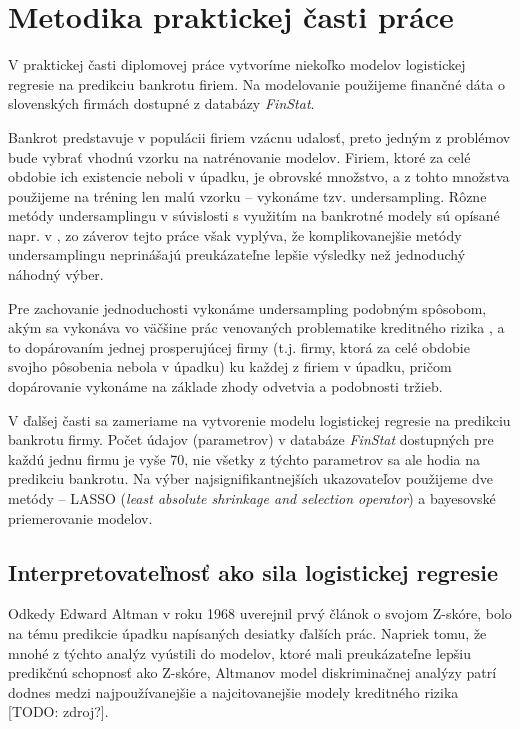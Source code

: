 \section{Metodika praktickej časti práce}
\label{metodika}

V praktickej časti diplomovej práce vytvoríme niekoľko modelov logistickej regresie na predikciu bankrotu firiem.
Na modelovanie použijeme finančné dáta o slovenských firmách dostupné z databázy \emph{FinStat}.

Bankrot predstavuje v populácii firiem vzácnu udalosť, preto jedným z problémov bude vybrať vhodnú vzorku na natrénovanie modelov.
Firiem, ktoré za celé obdobie ich existencie neboli v úpadku, je obrovské množstvo, a z tohto množstva použijeme na tréning len malú vzorku – vykonáme tzv. undersampling.
Rôzne metódy undersamplingu v súvislosti s využitím na bankrotné modely sú opísané napr. v \cite{protopapadakis},
zo záverov tejto práce však vyplýva, že komplikovanejšie metódy undersamplingu neprinášajú preukázateľne lepšie výsledky než jednoduchý náhodný výber.

Pre zachovanie jednoduchosti vykonáme undersampling podobným spôsobom, akým sa vykonáva vo väčšine prác venovaných problematike kreditného rizika \cite{zmijewski},
a to dopárovaním jednej prosperujúcej firmy (t.j. firmy, ktorá za celé obdobie svojho pôsobenia nebola v úpadku) ku každej z firiem v úpadku,
pričom dopárovanie vykonáme na základe zhody odvetvia a podobnosti tržieb.

V ďalšej časti sa zameriame na vytvorenie modelu logistickej regresie na predikciu bankrotu firmy.
Počet údajov (parametrov) v databáze \emph{FinStat} dostupných pre každú jednu firmu je vyše 70, nie všetky z týchto parametrov sa ale hodia na predikciu bankrotu.
Na výber najsignifikantnejších ukazovateľov použijeme dve metódy – LASSO (\emph{least absolute shrinkage and selection operator}) a bayesovské priemerovanie modelov.

\subsection{Interpretovateľnosť ako sila logistickej regresie} \label{model interpretability}

Odkedy Edward Altman v roku 1968 uverejnil prvý článok o svojom Z-skóre, bolo na tému predikcie úpadku napísaných desiatky ďalších prác.
Napriek tomu, že mnohé z týchto analýz vyústili do modelov, ktoré mali preukázateľne lepšiu predikčnú schopnosť ako Z-skóre,
Altmanov model diskriminačnej analýzy patrí dodnes medzi najpoužívanejšie a najcitovanejšie modely kreditného rizika [TODO: zdroj?].

